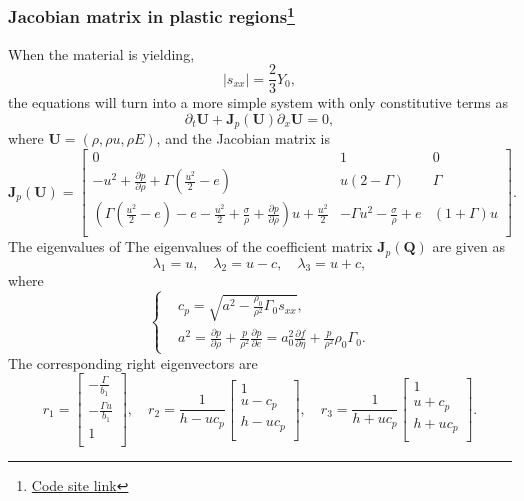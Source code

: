 \documentclass[review]{elsarticle}
\begin{document}
  \subsubsection{Jacobian matrix in  plastic  regions\footnote{\href{https://nbviewer.jupyter.org/github/bfly123/Exact-Elastic-plastic-Riemann-Solver-/blob/master/\%20CharacteristicForPlasticStateAfterYielding.ipynb\#}{Code site link}}}
When the material is yielding,
\begin{equation}
  |s_{xx}| = \frac{2}{3}Y_0,
\end{equation}
the equations will turn into a more simple system with only constitutive terms as
\begin{equation}
  \partial_t \mathbf{{U}} + \mathbf{J}_p(\mathbf{U})\partial_x \mathbf{{U}}= 0,
\end{equation}
where $\mathbf{U} = (\rho, \rho u, \rho E )$, and the Jacobian matrix is
\begin{equation}
\mathbf{J}_p(\mathbf{U}) = \left[\begin{array}{lll}
      0 & 1 & 0   \\
      -u^2 + \frac{\partial p}{\partial \rho} +\Gamma(\frac{u^2}{2}-e)& u(2-\Gamma)& \Gamma \\
	  (\Gamma(\frac{u^2}{2}-e)-e-\frac{u^2}{2}+\frac{\sigma}{\rho}+\frac{\partial p}{\partial \rho})u +\frac{u^2}{2} & -\Gamma u^2 -\frac{\sigma}{\rho} +e & (1+\Gamma)u\\
\end{array}
\right].
\end{equation} 
The eigenvalues of 
The eigenvalues of the coefficient matrix $\mathbf{J}_p(\mathbf{Q})$ are given as
$$\lambda_1 = u,\quad \lambda_2 = u-c, \quad \lambda_3 = u+c,$$
where 
\begin{equation}\label{eq:c_p}
  \left\{ \begin{aligned}
	  & c_p = \sqrt{a^2-\frac{\rho_0}{\rho^2}\Gamma_0 s_{xx}} ,\\
    &   a^2 = \frac{\partial p}{\partial \rho} + \frac{p}{\rho^2}\frac{\partial p}{\partial e} = a^2_0 \frac{\partial f}{\partial \eta} + \frac{p}{\rho^2}\rho_0 \Gamma_0.
      \end{aligned} \right.
    \end{equation}
The corresponding right eigenvectors are
\begin{equation}\label{eq:eivp}
  r_1 = \left[ \begin{array}{l}
	  -\frac{\Gamma}{b_1} \\
	  -\frac{\Gamma u}{b_1} \\
	  1\\
  \end{array}\right], \quad
  r_2 = \frac{1}{h-uc_p} \left[  \begin{array}{l}
	  1 \\
	  u-c_p \\
	  h-uc_p\\
  \end{array}\right], \quad
 r_3 = \frac{1}{h+uc_p}\left[ \begin{array}{l}
	  1 \\
	  u+c_p \\
	  h+uc_p\\
  \end{array}\right].
\end{equation}
\end{document}
